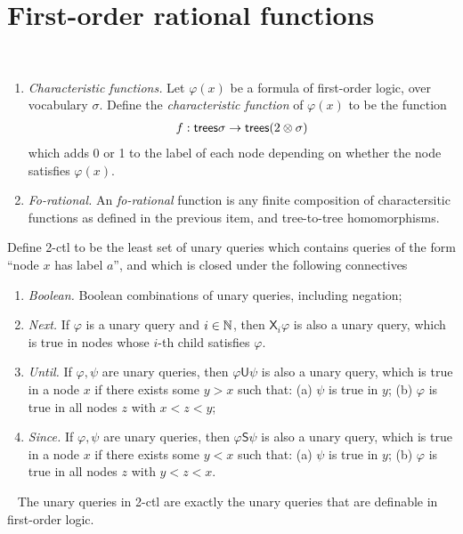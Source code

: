 \section{First-order rational functions}\label{sec:fo-rational}

\begin{definition}\ 
    \begin{enumerate}
        \item \emph{Characteristic functions.} Let $\varphi(x)$ be a formula of first-order logic, over vocabulary $\sigma$. Define the \emph{characteristic function} of $\varphi(x)$ to be the function
        \begin{align*}
            f : \mathsf {trees} \sigma \to \mathsf {trees} (2 \otimes \sigma)
        \end{align*}
        which adds 0 or 1 to  the label of each node depending on whether the node satisfies $\varphi(x)$.
        \item \emph{Fo-rational.} An \emph{fo-rational} function is any finite composition of charactersitic functions as defined in the previous item, and tree-to-tree homomorphisms. 
    \end{enumerate}
     
\end{definition}


\newcommand{\nextmod}{\mathsf X}
\newcommand{\untilmod}{\mathsf U}
\newcommand{\sincemod}{\mathsf S}


\begin{definition}[2-ctl]
    Define 2-ctl to be the least set of unary queries which contains queries of the form ``node $x$ has label $a$'', and which is closed under the following connectives
    \begin{enumerate}
        \item \emph{Boolean.} Boolean combinations of unary queries, including negation;
        \item \emph{Next.} If $\varphi$ is a unary query and $i \in {\mathbb N}$, then  $\nextmod_i \varphi$ is also a unary query, which is true in nodes whose $i$-th child satisfies $\varphi$.
         \item \emph{Until.} If $\varphi,\psi$ are  unary queries, then  $\varphi \untilmod \psi$ is also a unary query, which is true in a node $x$ if there exists some $y > x$ such that: (a) $\psi$ is true in $y$; (b) $\varphi$ is true in all nodes $z$ with $x < z < y$;
         \item \emph{Since.} If $\varphi,\psi$ are  unary queries, then  $\varphi \sincemod \psi$ is also a unary query, which is true in a node $x$ if there exists some $y < x$ such that: (a) $\psi$ is true in $y$; (b) $\varphi$ is true in all nodes $z$ with $y < z < x$.
    \end{enumerate}
\end{definition}
\begin{theorem} ~\cite[Theorem 2.6]{schlingloff1992expressive} The unary queries in 2-ctl are exactly the unary queries that are definable in first-order logic.
\end{theorem}


